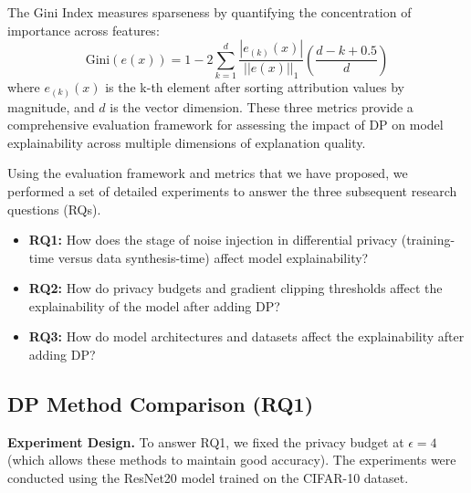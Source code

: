 \documentclass{article}
\begin{document}
The Gini Index measures sparseness by quantifying the concentration of importance across features:
\[
\text{Gini}(e(x)) = 1 - 2\sum_{k=1}^d \frac{|e_{(k)}(x)|}{||e(x)||_1}\left(\frac{d-k+0.5}{d}\right)
\]
where $e_{(k)}(x)$ is the k-th element after sorting attribution values by magnitude, and $d$ is the vector dimension. These three metrics provide a comprehensive evaluation framework for assessing the impact of DP on model explainability across multiple dimensions of explanation quality.


Using the evaluation framework and metrics that we have proposed, we performed a set of detailed experiments to answer the three subsequent research questions (RQs).

\begin{itemize}[leftmargin=*]


\item \textbf{RQ1:} How does the stage of noise injection in differential privacy (training-time versus data synthesis-time) affect model explainability?

\item \textbf{RQ2:} How do privacy budgets and gradient clipping thresholds affect the explainability of the model after adding DP?

\item \textbf{RQ3:} How do model architectures and datasets affect the explainability after adding DP?

\end{itemize}

\subsection{DP Method Comparison (RQ1)}

\noindent \textbf{Experiment Design.} To answer RQ1, we fixed the privacy budget at $\epsilon = 4$ (which allows these methods to maintain good accuracy). The experiments were conducted using the ResNet20 model trained on the CIFAR-10 dataset.
\end{document}

